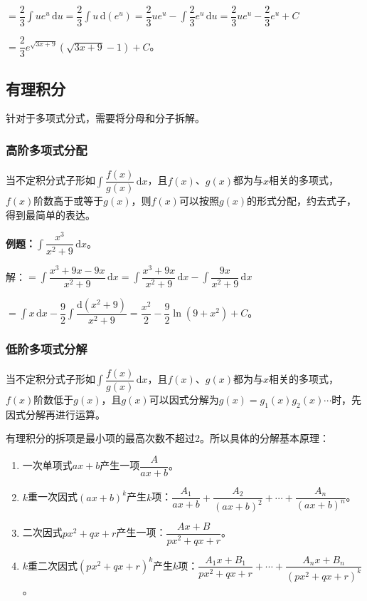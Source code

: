 \documentclass[UTF8, 12pt]{ctexart}
\begin{document}
$=\displaystyle{\dfrac{2}{3}\int ue^u\,\textrm{d}u=\dfrac{2}{3}\int u\,\textrm{d}(e^u)=\dfrac{2}{3}ue^u-\int\dfrac{2}{3}e^u\,\textrm{d}u=\dfrac{2}{3}ue^u-\dfrac{2}{3}e^u+C}$

$=\dfrac{2}{3}e^{\sqrt{3x+9}}(\sqrt{3x+9}-1)+C$。

\subsection{有理积分}

针对于多项式分式，需要将分母和分子拆解。

\subsubsection{高阶多项式分配}

当不定积分式子形如$\displaystyle{\int\dfrac{f(x)}{g(x)}\,\textrm{d}x}$，且$f(x)$、$g(x)$都为与$x$相关的多项式，$f(x)$阶数高于或等于$g(x)$，则$f(x)$可以按照$g(x)$的形式分配，约去式子，得到最简单的表达。

\textbf{例题：}$\displaystyle{\int\dfrac{x^3}{x^2+9}\,\textrm{d}x}$。 \medskip

解：$=\displaystyle{\int\dfrac{x^3+9x-9x}{x^2+9}\,\textrm{d}x=\int\dfrac{x^3+9x}{x^2+9}\,\textrm{d}x-\int\dfrac{9x}{x^2+9}\,\textrm{d}x}$ \medskip

$\displaystyle{=\int x\,\textrm{d}x-\dfrac{9}{2}\int\dfrac{\textrm{d}(x^2+9)}{x^2+9}}=\dfrac{x^2}{2}-\dfrac{9}{2}\ln(9+x^2)+C$。

\subsubsection{低阶多项式分解}

当不定积分式子形如$\displaystyle{\int\dfrac{f(x)}{g(x)}\,\textrm{d}x}$，且$f(x)$、$g(x)$都为与$x$相关的多项式，$f(x)$阶数低于$g(x)$，且$g(x)$可以因式分解为$g(x)=g_1(x)g_2(x)\cdots$时，先因式分解再进行运算。

有理积分的拆项是最小项的最高次数不超过2。所以具体的分解基本原理：

\begin{enumerate}
    \item 一次单项式$ax+b$产生一项$\dfrac{A}{ax+b}$。
    \item $k$重一次因式$(ax+b)^k$产生$k$项：$\dfrac{A_1}{ax+b}+\dfrac{A_2}{(ax+b)^2}+\cdots+\dfrac{A_n}{(ax+b)^n}$。
    \item 二次因式$px^2+qx+r$产生一项：$\dfrac{Ax+B}{px^2+qx+r}$。
    \item $k$重二次因式$(px^2+qx+r)^k$产生$k$项：$\dfrac{A_1x+B_1}{px^2+qx+r}+\cdots+\dfrac{A_nx+B_n}{(px^2+qx+r)^k}$。
\end{enumerate}
\end{document}

